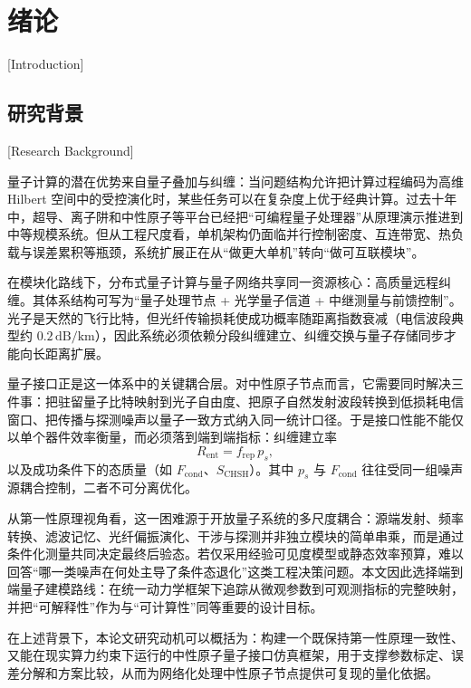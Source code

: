 \chapter{绪论}[Introduction]

\section{研究背景}[Research Background]

量子计算的潜在优势来自量子叠加与纠缠：当问题结构允许把计算过程编码为高维 Hilbert 空间中的受控演化时，某些任务可以在复杂度上优于经典计算。过去十年中，超导、离子阱和中性原子等平台已经把“可编程量子处理器”从原理演示推进到中等规模系统。但从工程尺度看，单机架构仍面临并行控制密度、互连带宽、热负载与误差累积等瓶颈，系统扩展正在从“做更大单机”转向“做可互联模块”。\cite{Wehner2018QuantumInternetVision,Azuma2023QuantumRepeatersReview}

在模块化路线下，分布式量子计算与量子网络共享同一资源核心：高质量远程纠缠。其体系结构可写为“量子处理节点 + 光学量子信道 + 中继测量与前馈控制”。光子是天然的飞行比特，但光纤传输损耗使成功概率随距离指数衰减（电信波段典型约 $0.2\,\mathrm{dB/km}$），因此系统必须依赖分段纠缠建立、纠缠交换与量子存储同步才能向长距离扩展。\cite{Azuma2023QuantumRepeatersReview,Zhu2025RemoteQuantumNetworksQuantumMemories}

量子接口正是这一体系中的关键耦合层。对中性原子节点而言，它需要同时解决三件事：把驻留量子比特映射到光子自由度、把原子自然发射波段转换到低损耗电信窗口、把传播与探测噪声以量子一致方式纳入同一统计口径。于是接口性能不能仅以单个器件效率衡量，而必须落到端到端指标：纠缠建立率
\begin{equation}
R_{\mathrm{ent}}=f_{\mathrm{rep}}\,p_s,
\end{equation}
以及成功条件下的态质量（如 $F_{\mathrm{cond}}$、$S_{\mathrm{CHSH}}$）。其中 $p_s$ 与 $F_{\mathrm{cond}}$ 往往受同一组噪声源耦合控制，二者不可分离优化。\cite{Reiserer2022CavityEnhancedNetworkNodes,vanleent2022entangling}

从第一性原理视角看，这一困难源于开放量子系统的多尺度耦合：源端发射、频率转换、滤波记忆、光纤偏振演化、干涉与探测并非独立模块的简单串乘，而是通过条件化测量共同决定最终后验态。若仅采用经验可见度模型或静态效率预算，难以回答“哪一类噪声在何处主导了条件态退化”这类工程决策问题。本文因此选择端到端量子建模路线：在统一动力学框架下追踪从微观参数到可观测指标的完整映射，并把“可解释性”作为与“可计算性”同等重要的设计目标。

在上述背景下，本论文研究动机可以概括为：构建一个既保持第一性原理一致性、又能在现实算力约束下运行的中性原子量子接口仿真框架，用于支撑参数标定、误差分解和方案比较，从而为网络化处理中性原子节点提供可复现的量化依据。%


